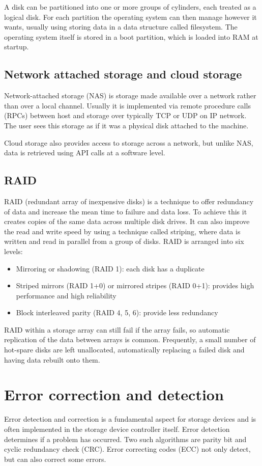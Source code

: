 A disk can be partitioned into one or more groups of cylinders, each treated as a logical disk. For each partition the operating system can then manage however it wants, usually using storing data in a data structure called filesystem. The operating system itself is stored in a boot partition, which is loaded into RAM at startup.

\subsection{Network attached storage and cloud storage}
Network-attached storage (NAS) is storage made available over a network rather than over a local channel. Usually it is implemented via remote procedure calls (RPCs) between host and storage over typically TCP or UDP on IP network. The user sees this storage as if it was a physical disk attached to the machine.

Cloud storage also provides access to storage across a network, but unlike NAS, data is retrieved using API calls at a software level.

\subsection{RAID}
RAID (redundant array of inexpensive disks) is a technique to offer redundancy of data and increase the mean time to failure and data loss. To achieve this it creates copies of the same data across multiple disk drives. It can also improve the read and write speed by using a technique called striping, where data is written and read in parallel from a group of disks. RAID is arranged into six levels:
\begin{itemize}
    \item Mirroring or shadowing (RAID 1): each disk has a duplicate
    \item Striped mirrors (RAID 1+0) or mirrored stripes (RAID 0+1): provides high performance and high reliability
    \item Block interleaved parity (RAID 4, 5, 6): provide less redundancy
\end{itemize}
RAID within a storage array can still fail if the array fails, so automatic replication of the data between arrays is common. Frequently, a small number of hot-spare disks are left unallocated, automatically replacing a failed disk and having data rebuilt onto them.

\section{Error correction and detection}
Error detection and correction is a fundamental aspect for storage devices and is often implemented in the storage device controller itself. Error detection determines if a problem has occurred. Two such algorithms are parity bit and cyclic redundancy check (CRC). Error correcting codes (ECC) not only detect, but can also correct some errors.